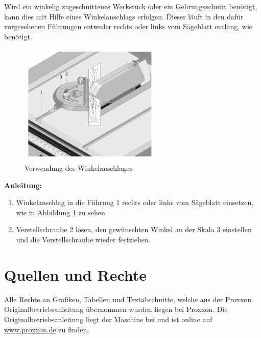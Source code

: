 \documentclass{\basedir/fablab-document}
\begin{document}
Wird ein winkelig zugeschnittenes Werkstück oder ein Gehrungsschnitt benötigt, kann dies mit Hilfe eines Winkelanschlags erfolgen. Dieser läuft in den dafür vorgesehenen Führungen entweder rechts oder links vom Sägeblatt entlang, wie benötigt.

\begin{figure} [h]
	\centering
	\includegraphics[width=0.6\textwidth]{bilder/Winkelanschlag.pdf}
	\caption{Verwendung des Winkelanschlages}
	\label{fig:winkelanschlag}
\end{figure}

\textbf{Anleitung:} \\
\renewcommand{\labelenumi}{\alph{enumi})}
\begin{enumerate}
	\item Winkelanschlag in die Führung 1 rechts oder links vom Sägeblatt einsetzen, wie in Abbildung \ref{fig:winkelanschlag} zu sehen.
	\item Verstellschraube 2 lösen, den gewünschten Winkel an der Skala 3 einstellen und die Verstellschraube wieder festziehen.

\end{enumerate}


\section{Quellen und Rechte}
\label{quellen}
Alle Rechte an Grafiken, Tabellen und Textabschnitte, welche aus der Proxxon Originalbetriebsanleitung übernommen wurden liegen bei Proxxon. Die Originalbetriebsanleitung liegt der Maschine bei und ist online auf \url{www.proxxon.de} zu finden. 
\end{document}
